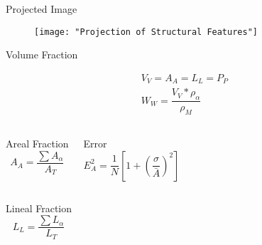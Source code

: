\documentclass[10pt]{beamer}
\begin{document}
{%
\begin{frame}[fragile]{Projected Image}

\begin{figure}[H]
\texttt{[image: "Projection of Structural Features"]}

\end{figure}
    
\end{frame}
}
{%
\begin{frame}[fragile]{Volume Fraction}

\begin{equation*}
\begin{gathered}
V_{V} = A_{A} = L_{L} = P_{P} \\
W_{W} = \dfrac{V_{V} * \rho_{\alpha}}{\rho_{M}}
\end{gathered}
\end{equation*}


  \begin{columns}[T,onlytextwidth]
 
\begin{block}{Areal Fraction}
\begin{equation*}
A_{A} = \dfrac{\sum A_{\alpha}}{A_{T}}
\end{equation*} 
\end{block}
 

\begin{block}{Error}
\begin{equation*}
E_{A}^{2} = \dfrac{1}{N}\left[ 1+ \left( \dfrac{\sigma}{\bar{A}} \right)^{2} \right]
\end{equation*} 
\end{block}

\end{columns}

  \begin{columns}[T,onlytextwidth]
\begin{block}{Lineal Fraction}
\begin{equation*}
L_{L} = \dfrac{\sum L_{\alpha}}{L_{T}}
\end{equation*} 
\end{block}
 

\end{columns}
\end{frame}}
\end{document}

